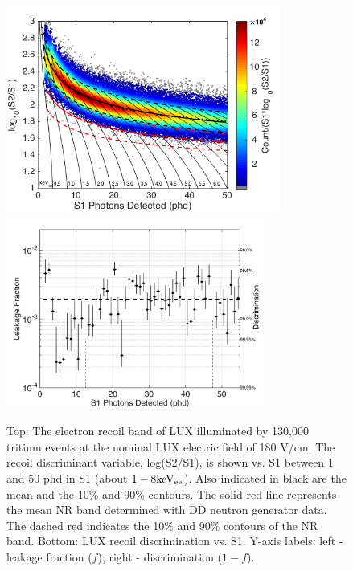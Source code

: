 \begin{figure}[h!]\centering
\includegraphics[width=90mm]{fig/CH3T_ER_Band.png}
\includegraphics[width=85mm]{fig/CH3T_Leakage_Run03.png}
\caption{Top: The electron recoil band of LUX illuminated by 130,000 tritium events at the nominal LUX electric field of 180 V/cm.  The recoil discriminant variable, log(S2/S1), is shown vs. S1 between 1 and 50 phd in S1 (about $\rm1-8 keV_{ee}$). Also indicated in black are the mean and the 10\% and 90\% contours. The solid red line represents the mean NR band determined with DD neutron generator data. The dashed red indicates the 10\% and 90\% contours of the NR band. Bottom: LUX recoil discrimination vs. S1. Y-axis labels: left -  leakage fraction ($f$); right - discrimination ($1-f$).}
\label{fig:ER_band}
\end{figure}





